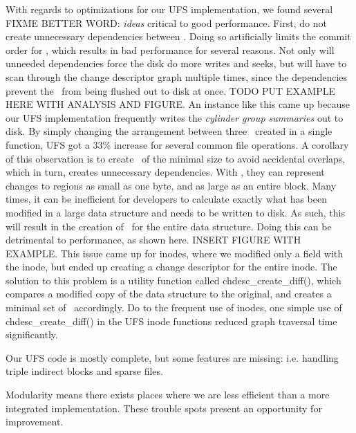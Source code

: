 With regards to optimizations for our UFS implementation, we found several
FIXME BETTER WORD: \emph{ideas} critical to good performance. First, do not
create unnecessary dependencies between \chdescs. Doing so artificially limits
the commit order for \chdescs, which results in bad performance for several
reasons. Not only will unneeded dependencies force the disk do more writes and
seeks, but \Kudos will have to scan through the change descriptor graph
multiple times, since the dependencies prevent the \chdescs\ from being
flushed out to disk at once. TODO PUT EXAMPLE HERE WITH ANALYSIS AND FIGURE. 
An instance like this came up because our UFS implementation frequently writes
the \emph{cylinder group summaries} out to disk. By simply changing the
arrangement between three \chdescs\ created in a single function, UFS got a
33\% increase for several common file operations.
A corollary of this observation is to create \chdescs\ of the minimal size
to avoid accidental overlaps, which in turn, creates unnecessary dependencies.
With \chdescs, they can represent changes to regions as small as one byte, and
as large as an entire block. Many times, it can be inefficient for developers
to calculate exactly what has been modified in a large data structure and needs
to be written to disk. As such, this will result in the creation of \chdescs\ 
for the entire data structure. Doing this can be detrimental to performance,
as shown here. INSERT FIGURE WITH EXAMPLE. This issue came up for inodes, where
we modified only a field with the inode, but ended up creating a change
descriptor for the entire inode. The solution to this problem is a utility
function called chdesc\_create\_diff(), which compares a modified copy of the
data structure to the original, and creates a minimal set of \chdescs\ 
accordingly. Do to the frequent use of inodes, one simple use of
chdesc\_create\_diff() in the UFS inode functions reduced \chdescs graph
traversal time significantly.

Our UFS code is mostly complete, but some features are missing:
i.e. handling triple indirect blocks and sparse files.

Modularity means there exists places where we are less efficient
than a more integrated implementation. These trouble spots present
an opportunity for improvement.

